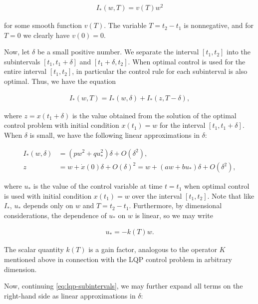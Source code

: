 \documentclass[11pt]{report}
\theoremstyle{plain}
\theoremstyle{definition}
\begin{document}
\begin{align*}
I_*(w,T) = v(T) w^2
\end{align*}

\noindent for some smooth function $v(T)$. The variable
$T=t_2-t_1$ is nonnegative, and for $T=0$ we clearly
have $v(0)=0$.

Now, let $\delta$ be a small positive number. We
separate the interval $[t_1,t_2]$ into the
subintervals $[t_1,t_1+\delta]$ and
$[t_1+\delta,t_2]$. When optimal control is used for
the entire interval $[t_1,t_2]$, in particular the
control rule for each subinterval is also optimal.
Thus, we have the equation

\begin{equation*} \tag{48}\label{eq:lqp-subintervals}
\begin{split}
I_*(w,T) = I_*(w,\delta) + I_*(z,T-\delta),
\end{split}
\end{equation*}

\noindent where $z=x(t_1+\delta)$ is the value obtained from the
solution of the optimal control problem with initial
condition $x(t_1)=w$ for the interval
$[t_1,t_1+\delta]$. When $\delta$ is small, we have
the following linear approximations in $\delta$:

\begin{equation*} \tag{49}\label{eq:lqp-approx}
\begin{split}
I_*(w,\delta) &= (p w^2 + q u_*^2)\delta + O(\delta^2), \\
z &= w + \dot{x}(0)\delta + O(\delta)^2 = w + (aw+b u_*)\delta + O(\delta^2),
\end{split}
\end{equation*}

\noindent where $u_*$ is the value of the control variable at
time $t=t_1$ when optimal control is used with initial
condition $x(t_1)=w$ over the interval $[t_1,t_2]$.
Note that like $I_*$, $u_*$ depends only on $w$ and
$T=t_2-t_1$. Furthermore, by dimensional
considerations, the dependence of $u_*$ on $w$ is
linear, so we may write

\begin{align*}
u_* = - k(T)w.
\end{align*}

\noindent The scalar quantity $k(T)$ is a gain factor, analogous
to the operator $K$ mentioned above in connection with
the LQP control problem in arbitrary dimension.

Now, continuing \eqref{eq:lqp-subintervals}, we may
further expand all terms on the right-hand side as
linear approximations in $\delta$:
\end{document}
